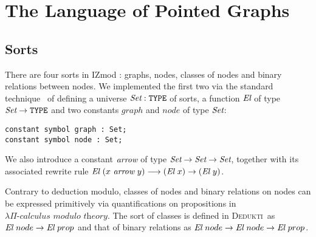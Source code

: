 \documentclass[submission,copyright,creativecommons]{eptcs}
\def\Type{\mbox{\tt TYPE}}
\def\ra{\rightarrow}
\def\lra{\longrightarrow}
\def\Set{\mbox{\it Set}}
\def\El{{\mbox{\it El}}}
\newcommand{\dedukti}{\textsc{Dedukti}}
\newcommand{\lpcm}{$\lambda \Pi\textit{-calculus modulo theory}$}
\def\arr{{\mbox{\it arrow}}}
\begin{document}
\begin{center}
\end{center}

\section{The Language of Pointed Graphs}

\subsection{Sorts}

There are four sorts in IZmod \cite[see Section 3.2]{zermodulo}: graphs, nodes, classes of nodes and binary relations between nodes. We implemented the first two via the standard technique~\cite{theoryU} of defining a universe $\Set:\Type$ of sorts, a function $\El$ of type $\Set \ra \Type$ and two constants $graph$ and $node$ of type $\Set$:
\begin{lstlisting}
constant symbol graph : Set;
constant symbol node : Set;
\end{lstlisting}
We also introduce a constant $\arr $ of type $\Set \ra \Set \ra \Set$, together with its associated rewrite rule $\El~(x~\arr~y) \lra (\El~x) \ra (\El~y)$.

Contrary to deduction modulo, classes of nodes and binary relations on nodes can be expressed primitively via quantifications on propositions in \lpcm. The sort of classes is defined in \dedukti ~as $\El~node \ra \El~prop$ and that of binary relations as $\El~node \ra \El~node \ra \El~prop$.
\end{document}
